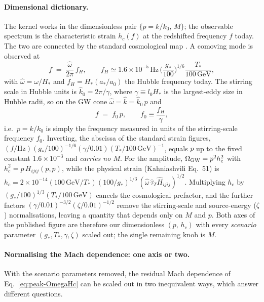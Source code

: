 \documentclass[10pt,prd,aps,nobibnotes,superscriptaddress,preprintnumbers,notitlepage]{revtex4-1}
\begin{document}
\paragraph{Dimensional dictionary.}
The kernel works in the dimensionless pair $\{p=k/k_0,\,M\}$; the observable
spectrum is the characteristic strain $h_c(f)$ at the redshifted frequency $f$
today. The two are connected by the standard cosmological map
\cite{Kahniashvili:2008pe,Gogoberidze:2007an}. A comoving mode is observed at
\begin{equation}
  f \;=\; \frac{\hat\omega}{2\pi}\,f_H,\qquad
  f_H \simeq 1.6\times10^{-5}\,\mathrm{Hz}\,
  \Big(\frac{g_*}{100}\Big)^{1/6}\frac{T_*}{100\,\mathrm{GeV}},
  \label{eq:fH}
\end{equation}
with $\hat\omega=\omega/H_*$ and $f_H=H_*(a_*/a_0)$ the Hubble frequency today.
The stirring scale in Hubble units is $\hat k_0=2\pi/\gamma$, where
$\gamma\equiv l_0 H_*$ is the largest-eddy size in Hubble radii, so on the GW cone
$\hat\omega=\hat k=\hat k_0\,p$ and
\begin{equation}
  f \;=\; f_0\,p,\qquad f_0\equiv\frac{f_H}{\gamma},
  \label{eq:f0}
\end{equation}
i.e.\ $p=k/k_0$ is simply the frequency measured in units of the stirring-scale
frequency $f_0$. Inverting, the abscissa of the standard strain figures,
$(f/\mathrm{Hz})(g_*/100)^{-1/6}(\gamma/0.01)(T_*/100\,\mathrm{GeV})^{-1}$,
equals $p$ up to the fixed constant $1.6\times10^{-3}$ and \emph{carries no $M$}.
For the amplitude, $\Omega_{\rm GW}=p^2 h_c^2$ with $h_c^2=p\,H_{ijij}(p,p)$, while the
physical strain (Kahniashvili Eq.~51) is
$h_c=2\times10^{-14}(100\,\mathrm{GeV}/T_*)(100/g_*)^{1/3}\,(\hat\omega\,\hat\tau_T
\hat H_{ijij})^{1/2}$. Multiplying $h_c$ by $(g_*/100)^{1/3}(T_*/100\,\mathrm{GeV})$
cancels the cosmological prefactor, and the further factors
$(\gamma/0.01)^{-3/2}(\zeta/0.01)^{-1/2}$ remove the stirring-scale and
source-energy ($\zeta$) normalisations, leaving a quantity that depends only on
$M$ and $p$. Both axes of the published figure are therefore our dimensionless
$(p,\,h_c)$ with every \emph{scenario} parameter $(g_*,T_*,\gamma,\zeta)$ scaled
out; the single remaining knob is $M$.

\paragraph{Normalising the Mach dependence: one axis or two.}
With the scenario parameters removed, the residual Mach dependence of
Eq.~\eqref{eq:peak-OmegaHc} can be scaled out in two inequivalent ways, which
answer different questions.
\end{document}
